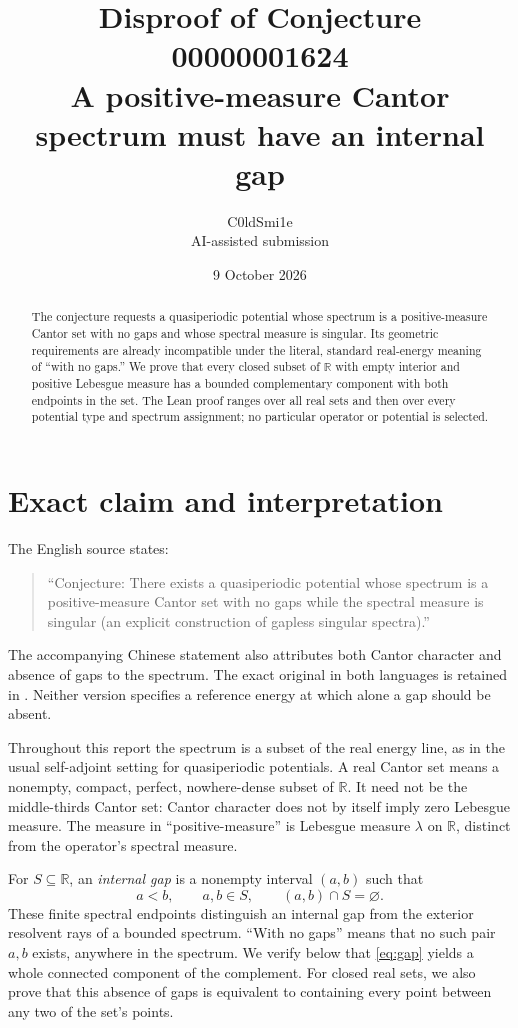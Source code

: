 \documentclass[11pt]{article}
\title{Disproof of Conjecture 00000001624\\[0.3em]
\large A positive-measure Cantor spectrum must have an internal gap}
\author{C0ldSmi1e\\\small AI-assisted submission}
\date{9 October 2026}
\newcommand{\R}{\mathbb R}
\newcommand{\vol}{\lambda}
\newcommand{\code}[1]{\texttt{\detokenize{#1}}}
\begin{document}
\maketitle
\begin{abstract}
The conjecture requests a quasiperiodic potential whose spectrum is a
positive-measure Cantor set with no gaps and whose spectral measure is singular.
Its geometric requirements are already incompatible under the literal,
standard real-energy meaning of ``with no gaps.'' We prove that every closed
subset of $\R$ with empty interior and positive Lebesgue measure has a bounded
complementary component with both endpoints in the set. The Lean proof ranges
over all real sets and then over every potential type and spectrum assignment;
no particular operator or potential is selected.
\end{abstract}

\section{Exact claim and interpretation}

The English source states:
\begin{quote}
\raggedright
``Conjecture: There exists a quasiperiodic potential whose spectrum is a
positive-measure Cantor set with no gaps while the spectral measure is singular
(an explicit construction of gapless singular spectra).''
\end{quote}
The accompanying Chinese statement also attributes both Cantor character and
absence of gaps to the spectrum. The exact original in both languages is
retained in \code{source/ORIGINAL.md}. Neither version specifies a reference
energy at which alone a gap should be absent.

Throughout this report the spectrum is a subset of the real energy line, as
in the usual self-adjoint setting for quasiperiodic potentials. A real Cantor
set means a nonempty, compact, perfect, nowhere-dense subset of $\R$. It need
not be the middle-thirds Cantor set: Cantor character does not by itself imply
zero Lebesgue measure. The measure in ``positive-measure'' is Lebesgue measure
$\vol$ on $\R$, distinct from the operator's spectral measure.

For $S\subseteq\R$, an \emph{internal gap} is a nonempty interval $(a,b)$ such
that
\begin{equation}\label{eq:gap}
 a<b,\qquad a,b\in S,\qquad (a,b)\cap S=\varnothing.
\end{equation}
These finite spectral endpoints distinguish an internal gap from the exterior
resolvent rays of a bounded spectrum. ``With no gaps'' means that no such pair
$a,b$ exists, anywhere in the spectrum. We verify below that
\eqref{eq:gap} yields a whole connected component of the complement. For closed
real sets, we also prove that this absence of gaps is equivalent to containing
every point between any two of the set's points.
\end{document}
